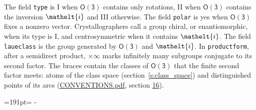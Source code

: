 \documentclass[10pt,a4paper]{article}
\newcommand{\needspace}[1]{\par\penalty-100\begingroup\dimen0=#1\relax\dimen2=\pagegoal
  \advance\dimen2-\pagetotal\ifdim\dimen0>\dimen2\relax\ifdim\dimen2>0pt\vfil\break\fi\fi
  \endgroup}
\numberwithin{equation}{section}
\newcommand{\eltfont}[1]{{\let\sigma\eltsigma\mathelt{#1}}}
\newcommand{\grp}[1]{\mathsf{#1}}
\newcommand{\elt}[1]{\eltfont{#1}}
\begin{document}
\leavevmode\label{n:element.inversion}The field \texttt{type} is I when $\grp{O(3)}$ contains only rotations, II when $\grp{O(3)}$ contains the inversion $\elt{i}$ and III otherwise. The field \texttt{polar} is yes when $\grp{O(3)}$ fixes a nonzero vector. Crystallographers call a group chiral, or enantiomorphic, when its type is I, and centrosymmetric when it contains $\elt{i}$. The field \texttt{laueclass} is the group generated by $\grp{O(3)}$ and $\elt{i}$.
In \texttt{productform}, after a semidirect product, ${\times}\infty$ marks infinitely many subgroups conjugate to its second factor. The braces contain the classes of $\grp{O(3)}$ that the finite second factor meets: atoms of the class space (section~\ref{s:class_space}) and distinguished points of its arcs (\href{../../CONVENTIONS.pdf}{CONVENTIONS.pdf}, section \href{../../CONVENTIONS.pdf\#conv.16}{16}).
\needspace{191pt}
\end{document}

